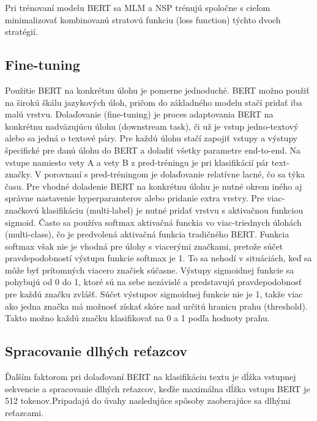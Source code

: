 Pri trénovaní modelu BERT sa MLM a NSP trénujú spoločne s cieľom minimalizovať kombinovanú stratovú funkciu (loss function) týchto dvoch stratégií. \cite{Horev:2019} \cite{Sun:2019} 

\subsection{Fine-tuning} \label{finetuning}

Použitie BERT na konkrétnu úlohu je pomerne jednoduché. BERT možno použiť na širokú škálu jazykových úloh, pričom do základného modelu stačí pridať iba malú vrstvu. Dolaďovanie (fine-tuning) je proces adaptovania BERT na konkrétnu nadväzujúcu úlohu (downstream task), či už je vstup jedno-textový alebo sa jedná o textové páry. Pre každú úlohu stačí zapojiť vstupy a výstupy špecifické pre danú úlohu do BERT a doladiť všetky parametre end-to-end. Na vstupe namiesto vety A a vety B z pred-tréningu je pri klasifikácií pár text-značky. V porovnaní s pred-tréningom je dolaďovanie relatívne lacné, čo sa týka času. 
Pre vhodné doladenie BERT na konkrétnu úlohu je nutné okrem iného aj správne nastavenie hyperparamterov alebo pridanie extra vrstvy. Pre viac-značkovú klasifikáciu (multi-label) je nutné pridať vrstvu s aktivačnou funkciou sigmoid. Často sa používa softmax aktivačná funckia vo viac-triednych  úlohách (multi-class), čo je predvolená aktivačná funkcia tradičného BERT. Funkcia softmax však nie je vhodná pre úlohy s viacerými značkami, pretože súčet pravdepodobností výstupu funkcie softmax je 1. To sa nehodí v situáciách, keď sa môže byť prítomných viacero značiek súčasne.  Výstupy sigmoidnej funkcie sa pohybujú od 0 do 1, ktoré sú na sebe nezávislé a predstavujú pravdepodobnosť pre každú značku zvlášť. Súčet výstupov sigmoidnej funkcie nie je 1, takže viac ako jedna značka má možnosť získať skóre nad určitú hranicu prahu (threshold). Takto možno každú značku klasifikovať na 0 a 1 podľa hodnoty prahu.
\cite{Devlin:2018} \cite{Sun:2019} \cite{Tang:2020}

\subsection{Spracovanie dlhých reťazcov} \label{dlhe}

Ďalším faktorom pri dolaďovaní BERT na klasifikáciu textu je dĺžka vstupnej sekvencie a spracovanie dlhých reťazcov, keďže maximálna dĺžka vstupu BERT je 512 tokenov.Pripadajú do úvahy nasledujúce spôsoby zaoberajúce sa dlhými reťazcami.

